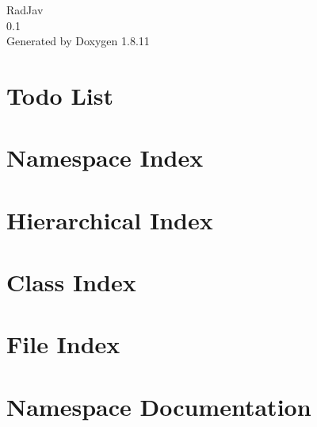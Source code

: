 \documentclass[twoside]{book}
\newcommand{\+}{\discretionary{\mbox{\scriptsize$\hookleftarrow$}}{}{}}
\newcommand{\clearemptydoublepage}{%
  \newpage{\pagestyle{empty}\cleardoublepage}%
}
\begin{document}
\hypersetup{pageanchor=false,
             bookmarksnumbered=true,
             pdfencoding=unicode
            }
\begin{titlepage}
\vspace*{7cm}
\begin{center}%
{\Large Rad\+Jav \\[1ex]\large 0.\+1 }\\
\vspace*{1cm}
{\large Generated by Doxygen 1.8.11}\\
\end{center}
\end{titlepage}
\clearemptydoublepage
\tableofcontents
\clearemptydoublepage
{}
\hypersetup{pageanchor=true}

\chapter{Todo List}
\label{todo}
\hypertarget{todo}{}

\chapter{Namespace Index}

\chapter{Hierarchical Index}

\chapter{Class Index}

\chapter{File Index}

\chapter{Namespace Documentation}



\end{document}
